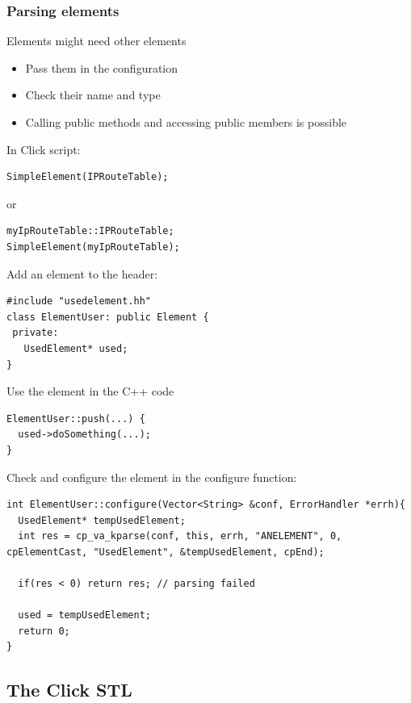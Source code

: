 \documentclass{beamer}
\begin{document}
\begin{frame}
\frametitle{Parsing elements}
Elements might need other elements
\begin{itemize}
	\item Pass them in the configuration
	\item Check their name and type
	\item Calling public methods and accessing public members is possible
\end{itemize}
In Click script: 
\begin{lstlisting}
SimpleElement(IPRouteTable);
\end{lstlisting}
or
\begin{lstlisting}
myIpRouteTable::IPRouteTable;
SimpleElement(myIpRouteTable);
\end{lstlisting}

Add an element to the header:
\begin{lstlisting}[basicstyle=\footnotesize]
#include "usedelement.hh"
class ElementUser: public Element {
 private: 
   UsedElement* used;
}
\end{lstlisting}

Use the element in the C++ code
\begin{lstlisting}[basicstyle=\footnotesize]
ElementUser::push(...) {
  used->doSomething(...);
}
\end{lstlisting}

\framebreak

Check and configure the element in the configure function:
\begin{lstlisting}[basicstyle=\footnotesize]
int ElementUser::configure(Vector<String> &conf, ErrorHandler *errh){
  UsedElement* tempUsedElement;
  int res = cp_va_kparse(conf, this, errh, "ANELEMENT", 0, cpElementCast, "UsedElement", &tempUsedElement, cpEnd);
  
  if(res < 0) return res; // parsing failed
  
  used = tempUsedElement;
  return 0;
}
\end{lstlisting}
\end{frame}


\subsection{The Click STL} %
\label{sub:the_click_stl}
\end{document}

